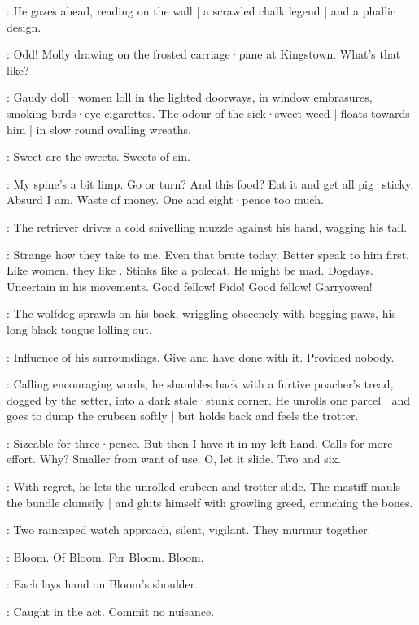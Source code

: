 :
He gazes ahead,
reading on the wall |
a scrawled chalk legend  |
and a phallic design.

\Bloom:
%
Odd!
Molly drawing on the frosted carriage·pane at Kingstown.
What's that like?

:
Gaudy doll·women loll in the lighted doorways,
in window embrasures,
smoking birds·eye cigarettes.
The odour of the sick·sweet weed |
floats towards him |
in slow round ovalling wreaths.

\Wreaths:
Sweet are the sweets.
Sweets of sin.

\Bloom:
My spine's a bit limp.
Go or turn?
And this food?
Eat it and get all pig·sticky.
Absurd I am.
Waste of money.
One and eight·pence too much.

:
The retriever drives a cold snivelling muzzle against his hand,
wagging his tail.

\Bloom:
Strange how they take to me.
Even that brute today.
Better speak to him first.
Like women,
they like .
Stinks like a polecat.
He might be mad.
Dogdays.
Uncertain in his movements.
Good fellow!
Fido!
Good fellow!
Garryowen!

:
The wolfdog sprawls on his back,
wriggling obscenely with begging paws,
his long black tongue lolling out.

\Bloom:
Influence of his surroundings.
Give and have done with it.
Provided nobody.

:
Calling encouraging words,
he shambles back with a furtive poacher's tread,
dogged by the setter,
into a dark stale·stunk corner.
He unrolls one parcel |
and goes to dump the crubeen softly |
but holds back and feels the trotter.

\Bloom:
Sizeable for three·pence.
But then I have it in my left hand.
Calls for more effort.
Why?
Smaller from want of use.
O,
let it slide.
Two and six.

:
With regret,
he lets the unrolled crubeen and trotter slide.
The mastiff mauls the bundle clumsily |
and gluts himself with growling greed,
crunching the bones.

:
Two raincaped watch approach,
silent,
vigilant.
They murmur together.

\Watch:
Bloom.
Of Bloom.
For Bloom.
Bloom.

:
Each lays hand on Bloom's shoulder.

\FirstWatch[1]:
Caught in the act.
Commit no nuisance.


